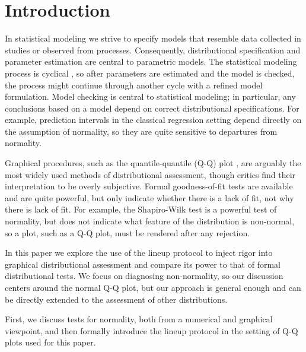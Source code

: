 \documentclass[12pt]{article}\usepackage[]{graphicx}\usepackage[]{color}
\newcommand{\alnote}[1]{\todo[inline,color=green!40]{#1}}
\begin{document}
\section{Introduction}

In statistical modeling we strive to specify models that resemble data collected in studies or observed from processes. Consequently, %
distributional specification and parameter estimation are central to parametric models.
The statistical modeling process is cyclical \citep{tukey:eda}, so after parameters are estimated and the model is checked, the process might continue through another cycle with a refined model formulation. Model checking is central to statistical modeling; in particular, any conclusions based on a model depend  on  correct distributional specifications. For example, prediction intervals in the classical regression setting depend directly on the assumption of normality, so they are quite sensitive to departures from normality. 

Graphical procedures, such as the quantile-quantile (Q-Q) plot \citep{Wilk:1968}, are arguably the most widely used methods of distributional assessment, though critics find their interpretation to be overly subjective. Formal goodness-of-fit tests are available and are quite powerful, but only indicate whether there is a lack of fit, not why there is lack of fit. For example, the Shapiro-Wilk test \citep{Shapiro:1965kt} is a powerful test of normality, but does not indicate what feature of the distribution is non-normal, so a plot, such as a Q-Q plot, must be rendered after any rejection. 

In this paper we explore the use of the lineup protocol \citep{buja:2009hp} to inject rigor into graphical distributional assessment and compare its power to that of formal distributional tests. We focus on diagnosing non-normality, so our discussion centers around the normal Q-Q plot, but our approach is general enough and can be directly extended to the assessment of other distributions.


First, we discuss  tests for normality, both from a numerical and graphical viewpoint, and then formally introduce the lineup protocol in the setting of Q-Q plots used for this paper.
\end{document}

